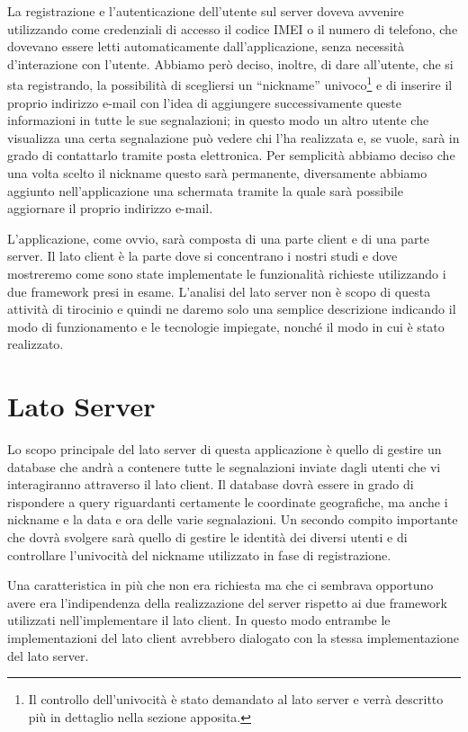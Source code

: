 	La registrazione e l'autenticazione dell'utente sul server doveva avvenire 
	utilizzando come credenziali di accesso il codice IMEI o il numero di
	telefono, che dovevano essere letti automaticamente dall'applicazione,
	senza necessità d'interazione con l'utente. Abbiamo però deciso, inoltre, di
	dare all'utente, che si sta registrando, la possibilità di scegliersi un
	``nickname'' univoco\footnote{Il controllo dell'univocità è stato demandato
	al lato server e verrà descritto più in dettaglio nella sezione apposita.}
	e di inserire il proprio indirizzo e-mail con l'idea di aggiungere
	successivamente queste informazioni in tutte le sue segnalazioni; in questo
	modo un altro utente che visualizza una certa segnalazione può vedere chi
	l'ha realizzata e, se vuole, sarà in grado di contattarlo tramite posta
	elettronica. Per semplicità abbiamo deciso che una volta scelto il nickname
	questo sarà permanente, diversamente abbiamo aggiunto nell'applicazione una
	schermata tramite la quale sarà possibile aggiornare il proprio indirizzo
	e-mail.
	
	L'applicazione, come ovvio, sarà composta di una parte client e di una parte
	server. Il lato client è la parte dove si concentrano i nostri studi e dove
	mostreremo come sono state implementate le funzionalità richieste
	utilizzando i due framework presi in esame. L'analisi del lato server non
	è scopo di questa attività di tirocinio e quindi ne daremo solo una
	semplice descrizione indicando il modo di funzionamento e le tecnologie
	impiegate, nonché il modo in cui è stato realizzato.
	
	\section{Lato Server}
		Lo scopo principale del lato server di questa applicazione è quello di
		gestire un database che andrà a contenere tutte le segnalazioni inviate
		dagli utenti che vi interagiranno attraverso il lato client. Il
		database dovrà essere in grado di rispondere a query riguardanti
		certamente le coordinate geografiche, ma anche i nickname e la data e
		ora delle varie segnalazioni. Un secondo compito importante che dovrà
		svolgere sarà quello di gestire le identità dei diversi utenti e di
		controllare l'univocità del nickname utilizzato in fase di
		registrazione.
		
		Una caratteristica in più che non era richiesta ma che ci sembrava
		opportuno avere era l'indipendenza della realizzazione del server
		rispetto ai due framework utilizzati nell'implementare il lato client.
		In questo modo entrambe le implementazioni del lato client avrebbero
		dialogato con la stessa implementazione del lato server.
		
